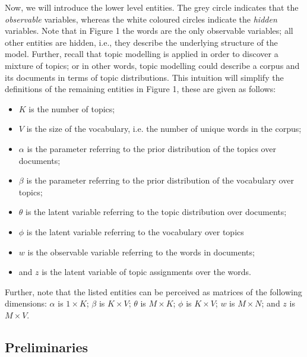 \documentclass{mprop}
\begin{document}
\par Now, we will introduce the lower level entities. The grey circle indicates that the \textit{observable} variables, whereas the white coloured circles indicate the \textit{hidden} variables. Note that in Figure 1 the words are the only observable variables; all other entities are hidden, i.e., they describe the underlying structure of the model. Further, recall that topic modelling is applied in order to discover a mixture of topics; or in other words, topic modelling could describe a corpus and its documents in terms of topic distributions. This intuition will simplify the definitions of the remaining entities in Figure 1, these are given as follows:
\begin{itemize}
\item $K$ is the number of topics;
\item $V$ is the size of the vocabulary, i.e. the number of unique words in the corpus;
\item $\alpha$ is the parameter referring to the prior distribution of the topics over documents;
\item $\beta$ is the parameter referring to the prior distribution of the vocabulary over topics;
\item $\theta$ is the latent variable referring to the topic distribution over documents;
\item $\phi$ is the latent variable referring to the vocabulary over topics
\item $w$ is the observable variable referring to the words in documents;
\item and $z$ is the latent variable of topic assignments over the words.
\end{itemize}
Further, note that the listed entities can be perceived as matrices of the following dimensions: $\alpha$ is $1 \times K$; $\beta$ is $K \times V$; $\theta$ is $M \times K$; $\phi$ is $K \times V$; $w$ is $M \times N$; and $z$ is $M \times V$.

\subsection{Preliminaries}
\end{document}
